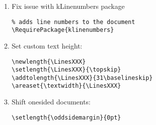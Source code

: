 \begin{enumerate}
\item Fix issue with kLinenumbers package
\begin{verbatim}
% adds line numbers to the document
\RequirePackage{klinenumbers}
\end{verbatim}

\item Set custom text height:
\begin{verbatim}
\newlength{\LinesXXX}
\setlength{\LinesXXX}{\topskip} 
\addtolength{\LinesXXX}{31\baselineskip} 
\areaset{\textwidth}{\LinesXXX}
\end{verbatim}

\item Shift onesided documents:
\begin{verbatim}
\setlength{\oddsidemargin}{0pt}
\end{verbatim}

\end{enumerate}



